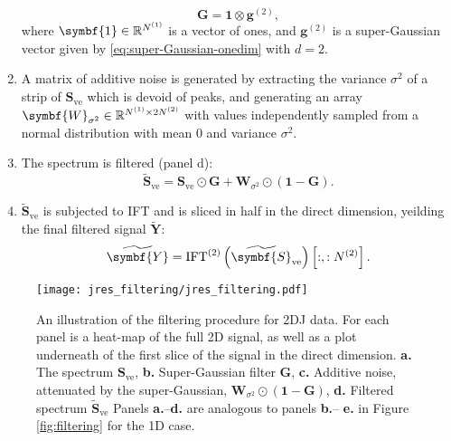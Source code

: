 \begin{enumerate}
\begin{equation}
            \symbf{G} = \symbf{1} \otimes \symbf{g}^{(2)},
        \end{equation}
        where $\symbf{1} \in \mathbb{R}^{\None}$ is a vector of ones, and
        $\symbf{g}^{(2)}$ is a super-Gaussian vector given by
        \eqref{eq:super-Gaussian-onedim} with $d=2$.
    \item A matrix of additive noise is generated by extracting the variance
        $\sigma^2$ of a strip of $\symbf{S}_{\text{ve}}$ which is devoid of
        peaks, and generating an array $\symbf{W}_{\sigma^2} \in
        \mathbb{R}^{\None \times 2 \Ntwo}$ with values independently sampled
        from a normal distribution with mean $0$ and variance  $\sigma^2$.
    \item The spectrum is filtered (panel d):
        \begin{equation}
            \widetilde{\symbf{S}}_{\text{ve}} = \symbf{S}_{\text{ve}} \odot
            \symbf{G} + \symbf{W}_{\sigma^2} \odot (\symbf{1} - \symbf{G}).
        \end{equation}
    \item $\widetilde{\symbf{S}}_{\text{ve}}$ is subjected to \ac{IFT} and is
        sliced in half in the direct dimension, yeilding the final filtered
        signal $\widetilde{\symbf{Y}}$:
        \begin{equation}
            \widetilde{\symbf{Y}} = \IFT^{(2)}\left(\widetilde{\symbf{S}}_{\text{ve}}\right) \left[:, : \Ntwo\right].
        \end{equation}
\end{enumerate}

\begin{figure}
    \centering
    \texttt{[image: jres\_filtering/jres\_filtering.pdf]}
    \caption[
        An illustration of the filtering procedure for \ac{2DJ} data.
    ]
    {
        An illustration of the filtering procedure for \ac{2DJ} data.
        For each panel is a heat-map of the full \ac{2D} signal, as well as a
        plot underneath of the first slice of the signal in the direct
        dimension.
        \textbf{a.} The spectrum $\symbf{S}_{\text{ve}}$,
        \textbf{b.} Super-Gaussian filter $\symbf{G}$,
        \textbf{c.} Additive noise, attenuated by the super-Gaussian, $\symbf{W}_{\sigma^2} \odot (\symbf{1} - \symbf{G})$,
        \textbf{d.} Filtered spectrum $\widetilde{\symbf{S}}_{\text{ve}}$
        Panels \textbf{a.}--\textbf{d.} are analogous to panels \textbf{b.}--
        \textbf{e.} in Figure \ref{fig:filtering} for the \ac{1D} case.
    }
    \label{fig:jres-filtering}
\end{figure}


